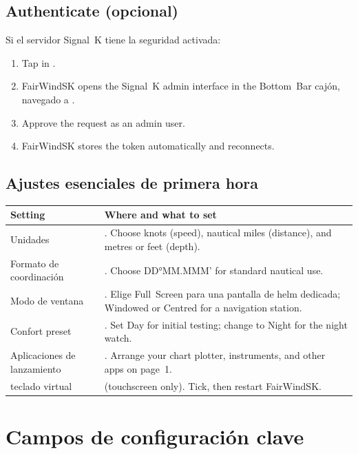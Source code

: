 \subsection{Authenticate (opcional)}

Si el servidor Signal~K tiene la seguridad activada:

\begin{enumerate}
  \item Tap  in .
  \item FairWindSK opens the Signal~K admin interface in the
Bottom~Bar cajón, navegado a
        .
  \item Approve the request as an admin user.
  \item FairWindSK stores the token automatically and reconnects.
\end{enumerate}

\subsection{Ajustes esenciales de primera hora}

\begin{longtable}{L{4.0cm}L{9.7cm}}
\toprule
{}
\color{white}\sffamily\bfseries Setting &
\color{white}\sffamily\bfseries Where and what to set \\
\midrule
Unidades&
  .
  Choose knots (speed), nautical miles (distance), and metres or feet (depth). \\
Formato de coordinación&
  .
  Choose DD°MM.MMM' for standard nautical use. \\
Modo de ventana&
  .
Elige Full~Screen para una pantalla de helm dedicada;
  Windowed or Centred for a navigation station. \\
Confort preset&
  .
  Set Day for initial testing; change to Night for the night watch. \\
Aplicaciones de lanzamiento&
  .
  Arrange your chart plotter, instruments, and other apps on page~1. \\
teclado virtual&
   (touchscreen only).
  Tick, then restart FairWindSK. \\
\bottomrule
\end{longtable}

\section{Campos de configuración clave}
\label{app:config}

